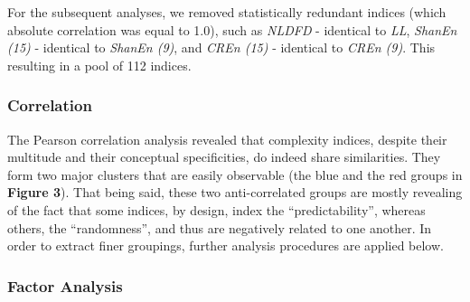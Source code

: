 \documentclass[
  man]{apa6}
\begin{document}
For the subsequent analyses, we removed statistically redundant indices (which absolute correlation was equal to 1.0), such as
\emph{NLDFD} - identical to \emph{LL},
\emph{ShanEn (15)} - identical to \emph{ShanEn (9)},
and \emph{CREn (15)} - identical to \emph{CREn (9)}.
This resulting in a pool of 112 indices.

\hypertarget{correlation}{%
\subsubsection{Correlation}\label{correlation}}

The Pearson correlation analysis revealed that complexity indices, despite their multitude and their conceptual specificities, do indeed share similarities. They form two major clusters that are easily observable (the blue and the red groups in \textbf{Figure 3}). That being said, these two anti-correlated groups are mostly revealing of the fact that some indices, by design, index the ``predictability'', whereas others, the ``randomness'', and thus are negatively related to one another. In order to extract finer groupings, further analysis procedures are applied below.

\hypertarget{factor-analysis}{%
\subsubsection{Factor Analysis}\label{factor-analysis}}
\end{document}
